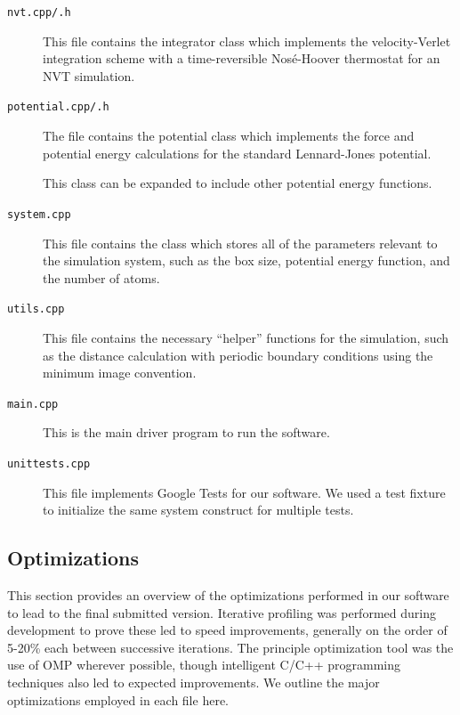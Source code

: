 \documentclass[12pt]{article}
\begin{document}
\begin{description}
\item[\texttt{nvt.cpp/.h}] This file contains the integrator class which implements the velocity-Verlet integration scheme with a time-reversible Nos\'{e}-Hoover thermostat for an NVT simulation.

\item[\texttt{potential.cpp/.h}] The file contains the potential class which implements the force and potential energy calculations for the standard Lennard-Jones potential.

%
This class can be expanded to include other potential energy functions.

\item[\texttt{system.cpp}] This file contains the class which stores all of the parameters relevant to the simulation system, such as the box size, potential energy function, and the number of atoms.

\item[\texttt{utils.cpp}] This file contains the necessary ``helper'' functions for the simulation, such as the distance calculation with periodic boundary conditions using the minimum image convention.

\item[\texttt{main.cpp}] This is the main driver program to run the software.

\item[\texttt{unittests.cpp}] This file implements Google Tests for our software.
%
We used a test fixture to initialize the same system construct for multiple tests.

\end{description}

\subsection{Optimizations}
This section provides an overview of the optimizations performed in our software to lead to the final submitted version.  Iterative profiling was performed during development to prove these led to speed improvements, generally on the order of 5-20\% each between successive iterations.  The principle optimization tool was the use of OMP wherever possible, though intelligent C/C++ programming techniques also led to expected improvements. We outline the major optimizations employed in each file here.
\end{document}
